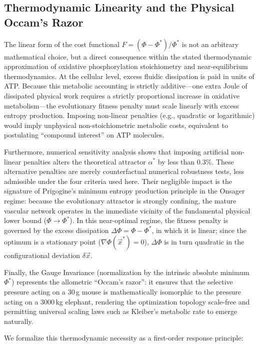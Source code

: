 \subsection{Thermodynamic Linearity and the Physical Occam's Razor}

The linear form of the cost functional $F = (\Phi - \Phi^*)/\Phi^*$ is not an
arbitrary mathematical choice, but a direct consequence within the stated
thermodynamic approximation of oxidative phosphorylation stoichiometry and
near-equilibrium thermodynamics. At the cellular level, excess fluidic
dissipation is paid in units of ATP. Because this metabolic accounting is
strictly additive---one extra Joule of dissipated physical work requires a
strictly proportional increase in oxidative metabolism---the evolutionary
fitness penalty must scale linearly with excess entropy production. Imposing
non-linear penalties (e.g., quadratic or logarithmic) would imply unphysical
non-stoichiometric metabolic costs, equivalent to postulating ``compound
interest'' on ATP molecules.

Furthermore, numerical sensitivity analysis shows that imposing artificial
non-linear penalties alters the theoretical attractor $\alpha^*$ by less than
$0.3\%$. These alternative penalties are merely counterfactual numerical
robustness tests, less admissible under the four criteria used here. Their
negligible impact is the signature of Prigogine's minimum entropy production
principle in the Onsager regime: because the evolutionary attractor is strongly
confining, the mature vascular network operates in the immediate vicinity of the
fundamental physical lower bound ($\Phi \to \Phi^*$). In this near-optimal
regime, the fitness penalty is governed by the excess dissipation
$\Delta\Phi=\Phi-\Phi^*$, in which it is linear; since the optimum is a
stationary point ($\nabla\Phi(\vec{x}^*)=0$), $\Delta\Phi$ is in turn quadratic
in the configurational deviation $\delta\vec{x}$.

Finally, the Gauge Invariance (normalization by the intrinsic absolute minimum
$\Phi^*$) represents the allometric ``Occam's razor'': it ensures that the
selective pressure acting on a $30$\,g mouse is mathematically isomorphic to the
pressure acting on a $3000$\,kg elephant, rendering the optimization topology
scale-free and permitting universal scaling laws such as Kleiber's metabolic
rate to emerge naturally.

We formalize this thermodynamic necessity as a first-order response principle:


